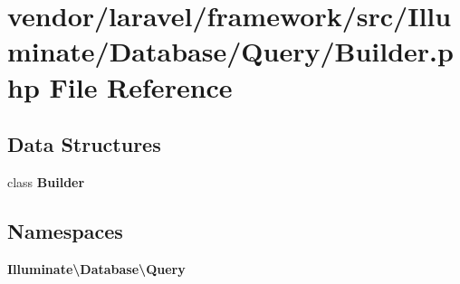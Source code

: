 \section{vendor/laravel/framework/src/\+Illuminate/\+Database/\+Query/\+Builder.php File Reference}
\label{laravel_2framework_2src_2_illuminate_2_database_2_query_2_builder_8php}
\subsection*{Data Structures}
\begin{DoxyCompactItemize}
\item 
class {\bf Builder}
\end{DoxyCompactItemize}
\subsection*{Namespaces}
\begin{DoxyCompactItemize}
\item 
 {\bf Illuminate\textbackslash{}\+Database\textbackslash{}\+Query}
\end{DoxyCompactItemize}

